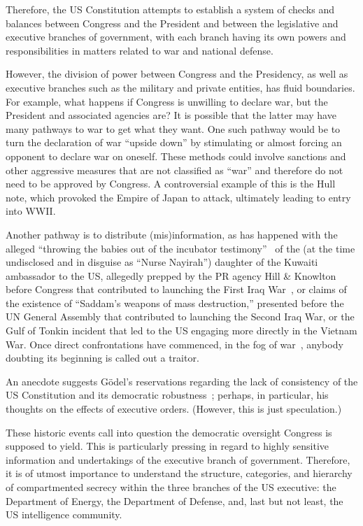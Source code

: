 Therefore, the US Constitution attempts to establish a system of checks and balances between Congress and the President and between the legislative and executive branches of government, with each branch having its own powers and responsibilities in matters related to war and national defense.

However, the division of power between Congress and the Presidency,
as well as executive branches such as the military and private entities, has fluid boundaries.
For example, what happens if Congress is unwilling to declare war, but the President and associated agencies are?
It is possible that the latter may have many pathways to war to get what they want.
One such pathway would be to turn the declaration of war ``upside down'' by stimulating or almost forcing an opponent
to declare war on oneself.
These methods could involve sanctions and other aggressive measures that are
not classified as ``war'' and therefore do not need to be approved by Congress.
A controversial example of this is the Hull note, which provoked the Empire of Japan to attack,
ultimately leading to entry into WWII.


Another pathway
is to distribute (mis)information, as has happened with the alleged
``throwing the babies out of the incubator testimony''~\cite{guyjohn592010Jun}
of the (at the time undisclosed and in disguise as ``Nurse Nayirah'')
daughter of the Kuwaiti ambassador to the US,
allegedly prepped by the PR agency Hill \& Knowlton before Congress that contributed
to launching the First Iraq War~\cite{krazyhandz6662011Sep},
or claims of the existence of ``Saddam's weapons of mass destruction,''
presented before the UN General Assembly that contributed to launching the Second Iraq War,
or
the Gulf of Tonkin incident that led to the US engaging more directly in the Vietnam War.
Once direct confrontations have commenced, in the fog of war~\cite{Morris-fog-of-war},
anybody doubting its beginning is called out a traitor.


An anecdote suggests G\"odel's reservations regarding the lack of consistency of the US Constitution and its democratic robustness~\cite{Morgenstern1971Jan}; perhaps, in particular, his thoughts on the effects of executive orders. (However, this is just speculation.)

These historic events call into question the democratic oversight Congress is supposed to yield. This is particularly pressing in regard to highly sensitive information and undertakings of the executive branch of government. Therefore, it is of utmost importance to understand the structure, categories, and hierarchy of compartmented secrecy within the three branches of the US executive: the Department of Energy, the Department of Defense, and, last but not least, the US intelligence community.


